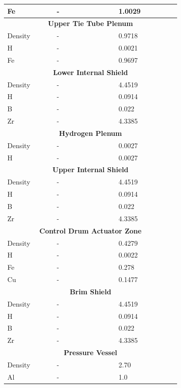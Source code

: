 \documentclass[8pt,a5paper]{article}
\begin{document}
\begin{longtable}{|m{0.2\linewidth}|m{0.25\linewidth}|m{0.25\linewidth}|}
    Fe & - & \SI{1.0029}{} \\\hline
    \multicolumn{3}{|c|}{\textbf{Upper Tie Tube Plenum}}\\\hline
    Density & - & \SI{0.9718}{} \\
    H & - & \SI{0.0021}{} \\
    Fe & - & \SI{0.9697}{} \\\hline
    \multicolumn{3}{|c|}{\textbf{Lower Internal Shield}}\\\hline
    Density & - & \SI{4.4519}{} \\
    H & - & \SI{0.0914}{} \\
    B & - & \SI{0.022}{} \\
    Zr & - & \SI{4.3385}{} \\\hline
    \multicolumn{3}{|c|}{\textbf{Hydrogen Plenum}}\\\hline
    Density & - & \SI{0.0027}{} \\
    H & - & \SI{0.0027}{} \\\hline
    \multicolumn{3}{|c|}{\textbf{Upper Internal Shield}}\\\hline
    Density & - & \SI{4.4519}{} \\
    H & - & \SI{0.0914}{} \\
    B & - & \SI{0.022}{} \\
    Zr & - & \SI{4.3385}{} \\\hline
    \multicolumn{3}{|c|}{\textbf{Control Drum Actuator Zone}}\\\hline
    Density & - & \SI{0.4279}{} \\
    H & - & \SI{0.0022}{} \\
    Fe & - & \SI{0.278}{} \\
    Cu & - & \SI{0.1477}{} \\\hline
    \multicolumn{3}{|c|}{\textbf{Brim Shield}}\\\hline
    Density & - & \SI{4.4519}{} \\
    H & - & \SI{0.0914}{} \\
    B & - & \SI{0.022}{} \\
    Zr & - & \SI{4.3385}{} \\\hline
    \multicolumn{3}{|c|}{\textbf{Pressure Vessel}}\\\hline
    Density & - & \SI{2.70}{} \\
    Al & - & \SI{1.0}{} \\
\end{longtable}
\end{document}
